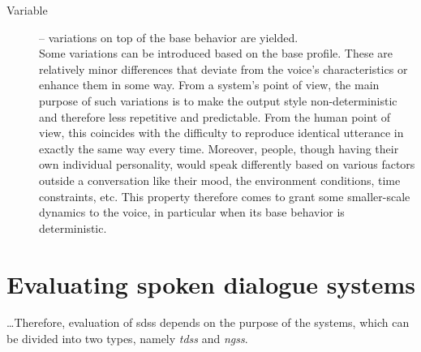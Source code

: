 \begin{description}
	\item[Variable] -- variations on top of the base behavior are yielded.\\
	Some variations can be introduced based on the base profile.
	These are relatively minor differences that deviate from the voice's characteristics or enhance them in some way.
	From a system's point of view, the main purpose of such variations is to make the output style non-deterministic and therefore less repetitive and predictable.
	From the human point of view, this coincides with the difficulty to reproduce identical utterance in exactly the same way every time.
	Moreover, people, though having their own individual personality, would speak differently based on various factors outside a conversation like their mood, the environment conditions, time constraints, etc.
	This property therefore comes to grant some smaller-scale dynamics to the voice, in particular when its base behavior is deterministic.
\end{description}
%



\section{Evaluating spoken dialogue systems}
\label{sec:evaluation_of_sdss}

\ldots Therefore, evaluation of \acp{sds} depends on the purpose of the systems, which can be divided into two types, namely \textit{\aclp{tds}} and \textit{\aclp{ngs}}.

